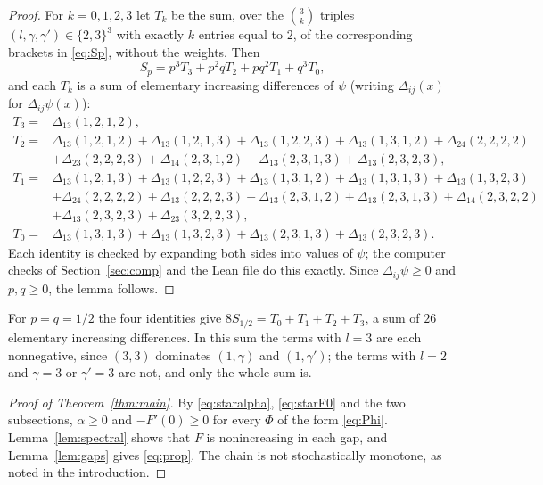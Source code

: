 \documentclass[11pt]{amsart}
\theoremstyle{remark}
\numberwithin{equation}{section}
\newcommand{\1}{\mathbf 1}
\begin{document}
\begin{proof}
For $k=0,1,2,3$ let $T_k$ be the sum, over the $\binom3k$ triples $(l,\gamma,\gamma')\in\{2,3\}^3$ with exactly $k$ entries equal to $2$, of the corresponding brackets in \eqref{eq:Sp}, without the weights. Then
\begin{equation}\label{eq:cubic}
S_p=p^3T_3+p^2qT_2+pq^2T_1+q^3T_0,
\end{equation}
and each $T_k$ is a sum of elementary increasing differences of $\psi$ (writing $\Delta_{ij}(x)$ for $\Delta_{ij}\psi(x)$):
\begin{align*}
T_3={}&\Delta_{13}(1,2,1,2),\\
T_2={}&\Delta_{13}(1,2,1,2)+\Delta_{13}(1,2,1,3)+\Delta_{13}(1,2,2,3)+\Delta_{13}(1,3,1,2)+\Delta_{24}(2,2,2,2)\\
&+\Delta_{23}(2,2,2,3)+\Delta_{14}(2,3,1,2)+\Delta_{13}(2,3,1,3)+\Delta_{13}(2,3,2,3),\\
T_1={}&\Delta_{13}(1,2,1,3)+\Delta_{13}(1,2,2,3)+\Delta_{13}(1,3,1,2)+\Delta_{13}(1,3,1,3)+\Delta_{13}(1,3,2,3)\\
&+\Delta_{24}(2,2,2,2)+\Delta_{13}(2,2,2,3)+\Delta_{13}(2,3,1,2)+\Delta_{13}(2,3,1,3)+\Delta_{14}(2,3,2,2)\\
&+\Delta_{13}(2,3,2,3)+\Delta_{23}(3,2,2,3),\\
T_0={}&\Delta_{13}(1,3,1,3)+\Delta_{13}(1,3,2,3)+\Delta_{13}(2,3,1,3)+\Delta_{13}(2,3,2,3).
\end{align*}
Each identity is checked by expanding both sides into values of $\psi$; the computer checks of Section~\ref{sec:comp} and the Lean file do this exactly. Since $\Delta_{ij}\psi\ge0$ and $p,q\ge0$, the lemma follows.
\end{proof}

For $p=q=1/2$ the four identities give $8S_{1/2}=T_0+T_1+T_2+T_3$, a sum of $26$ elementary increasing differences. In this sum the terms with $l=3$ are each nonnegative, since $(3,3)$ dominates $(1,\gamma)$ and $(1,\gamma')$; the terms with $l=2$ and $\gamma=3$ or $\gamma'=3$ are not, and only the whole sum is.

\begin{proof}[Proof of Theorem~\textup{\ref{thm:main}}]
By \eqref{eq:staralpha}, \eqref{eq:starF0} and the two subsections, $\alpha\ge0$ and $-F'(0)\ge0$ for every $\Phi$ of the form \eqref{eq:Phi}. Lemma~\ref{lem:spectral} shows that $F$ is nonincreasing in each gap, and Lemma~\ref{lem:gaps} gives \eqref{eq:prop}. The chain is not stochastically monotone, as noted in the introduction.
\end{proof}
\end{document}
